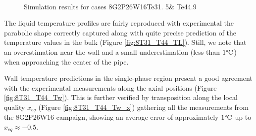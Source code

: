 \begin{figure}[!h]
\centering
{}
\\
\caption{Simulation results for cases 8G2P26W16Te31. 5\& Te44.9}
\label{fig:deb_cfd_8T33_T44}
\end{figure}

\npar

The liquid temperature profiles are fairly reproduced with experimental the parabolic shape correctly captured along with quite precise prediction of the temperature values in the bulk (Figure \ref{fig:8T31_T44_TL}). Still, we note that an overestimation near the wall and a small underestimation (less than $1\degree\mathrm{C}$) when approaching the center of the pipe.

\npar

Wall temperature predictions in the single-phase region present a good agreement with the experimental measurements along the axial positions (Figure \ref{fig:8T31_T44_Tw}). This is further verified by transposition along the local quality $x_{eq}$ (Figure \ref{fig:8T31_T44_Tw_x}) gathering all the measurements from the 8G2P26W16 campaign, showing an average error of approximately $1 \degree\mathrm{C}$ up to $x_{eq} \approx -0.5$.

